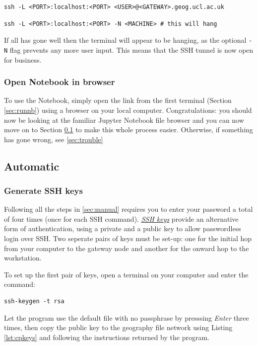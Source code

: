 \documentclass[a4paper]{article}
\begin{document}
\begin{lstlisting}[caption={Tunnel to gateway server}, label={lst:tunnel1}]
ssh -L <PORT>:localhost:<PORT> <USER>@<GATEWAY>.geog.ucl.ac.uk
\end{lstlisting}

\begin{lstlisting}[caption={Tunnel to cluster machine}, label={lst:tunnel2}]
ssh -L <PORT>:localhost:<PORT> -N <MACHINE> # this will hang
\end{lstlisting}

If all has gone well then the terminal will appear to be hanging, as the optional \texttt{-N} flag prevents any more user input.
This means that the SSH tunnel is now open for business.

\subsubsection{Open Notebook in browser}
\label{sec:opennb}

To use the Notebook, simply open the link from the first terminal (Section \ref{sec:runnb}) using a browser on your local computer. 
Congratulations: you should now be looking at the familiar Jupyter Notebook file browser and you can now move on to Section \ref{sec:auto} to make this whole process easier.
Otherwise, if something has gone wrong, see \ref{sec:trouble} 

\subsection{Automatic}
\label{sec:auto}

\subsubsection{Generate SSH keys}
\label{sec:sshkeys}
Following all the steps in \ref{sec:manual} requires you to enter your password a total of four times (once for each SSH command).
\href{https://wiki.archlinux.org/index.php/SSH_keys}{\emph{SSH keys}} provide an alternative form of authentication, using a private and a public key to allow passwordless login over SSH.
Two seperate pairs of keys must be set-up: one for the initial hop from your computer to the gateway node and another for the onward hop to the workstation.

To set up the first pair of keys, open a terminal on your computer and enter the command:
\begin{lstlisting}[caption={Generate SSH keys}, label={lst:genkeys}]
ssh-keygen -t rsa
\end{lstlisting}
Let the program use the default file with no passphrase by presssing \emph{Enter} three times, then copy the public key to the geography file network using Listing \ref{lst:cpkeys} and following the instructions returned by the program.
\end{document}
